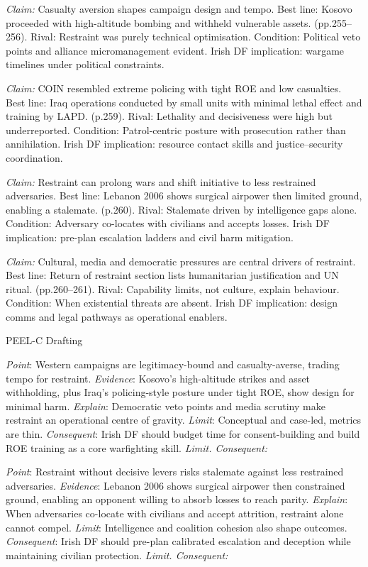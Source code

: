 \textit{Claim:} Casualty aversion shapes campaign design and tempo. Best line: Kosovo proceeded with high-altitude bombing and withheld vulnerable assets. (pp.255–256). Rival: Restraint was purely technical optimisation. Condition: Political veto points and alliance micromanagement evident. Irish DF implication: wargame timelines under political constraints.

\textit{Claim:} COIN resembled extreme policing with tight ROE and low casualties. Best line: Iraq operations conducted by small units with minimal lethal effect and training by LAPD. (p.259). Rival: Lethality and decisiveness were high but underreported. Condition: Patrol-centric posture with prosecution rather than annihilation. Irish DF implication: resource contact skills and justice–security coordination.

\textit{Claim:} Restraint can prolong wars and shift initiative to less restrained adversaries. Best line: Lebanon 2006 shows surgical airpower then limited ground, enabling a stalemate. (p.260). Rival: Stalemate driven by intelligence gaps alone. Condition: Adversary co-locates with civilians and accepts losses. Irish DF implication: pre-plan escalation ladders and civil harm mitigation.

\textit{Claim:} Cultural, media and democratic pressures are central drivers of restraint. Best line: Return of restraint section lists humanitarian justification and UN ritual. (pp.260–261). Rival: Capability limits, not culture, explain behaviour. Condition: When existential threats are absent. Irish DF implication: design comms and legal pathways as operational enablers.

PEEL-C Drafting

\textit{Point}: Western campaigns are legitimacy-bound and casualty-averse, trading tempo for restraint.
\textit{Evidence}: Kosovo’s high-altitude strikes and asset withholding, plus Iraq’s policing-style posture under tight ROE, show design for minimal harm.
\textit{Explain}: Democratic veto points and media scrutiny make restraint an operational centre of gravity.
\textit{Limit}: Conceptual and case-led, metrics are thin.
\textit{Consequent}: Irish DF should budget time for consent-building and build ROE training as a core warfighting skill.
\textit{Limit. Consequent:}

\textit{Point}: Restraint without decisive levers risks stalemate against less restrained adversaries.
\textit{Evidence}: Lebanon 2006 shows surgical airpower then constrained ground, enabling an opponent willing to absorb losses to reach parity.
\textit{Explain}: When adversaries co-locate with civilians and accept attrition, restraint alone cannot compel.
\textit{Limit}: Intelligence and coalition cohesion also shape outcomes.
\textit{Consequent}: Irish DF should pre-plan calibrated escalation and deception while maintaining civilian protection.
\textit{Limit. Consequent:}

